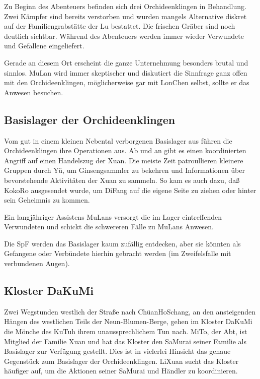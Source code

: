 \documentclass[
a4paper,
twoside,
DIV=calc,
BCOR=4mm,
fontsize=9pt,
twocolumn=on,
titlepage=on,
parskip=half
]{scrartcl}
\begin{document}
Zu Beginn des Abenteuers befinden sich drei Orchideenklingen in
Behandlung. Zwei Kämpfer sind bereits verstorben und wurden mangels
Alternative diskret auf der Familiengrabstätte der Lu bestattet. Die
frischen Gräber sind noch deutlich sichtbar. Während des Abenteuers
werden immer wieder Verwundete und Gefallene eingeliefert.

Gerade an diesem Ort erscheint die ganze Unternehmung besonders brutal
und sinnlos. MuLan wird immer skeptischer und diskutiert die Sinnfrage
ganz offen mit den Orchideenklingen, möglicherweise gar mit LonChen
selbst, sollte er das Anwesen besuchen.

\subsection{Basislager der Orchideenklingen}

Vom gut in einem kleinen Nebental verborgenen Basislager aus führen
die Orchideenklingen ihre Operationen aus. Ab und an gibt es einen
koordinierten Angriff auf einen Handelszug der Xuan. Die meiste Zeit
patroullieren kleinere Gruppen durch Yü, um Ginsengsammler zu bekehren
und Informationen über bevorstehende Aktivitäten der Xuan zu
sammeln. So kam es auch dazu, daß KokoRo ausgesendet wurde, um DiFang
auf die eigene Seite zu ziehen oder hinter sein Geheimnis zu kommen.

Ein langjähriger Assistens MuLans versorgt die im Lager eintreffenden
Verwundeten und schickt die schwereren Fälle zu MuLans Anwesen.

Die SpF werden das Basislager kaum zufällig entdecken, aber sie
könnten als Gefangene oder Verbündete hierhin gebracht werden (im
Zweifelsfalle mit verbundenen Augen).

\subsection{Kloster DaKuMi}

Zwei Wegstunden westlich der Straße nach ChüanHoSchang, an den
ansteigenden Hängen des westlichen Teils der Neun-Blumen-Berge, gehen
im Kloster DaKuMi die Mönche des KuTuh ihrem unaussprechlichem Tun
nach. MiTo, der Abt, ist Mitglied der Familie Xuan und hat das Kloster
den SaMurai seiner Familie als Basislager zur Verfügung gestellt. Dies
ist in vielerlei Hinsicht das genaue Gegenstück zum Basislager der
Orchideenklingen. LiXuan sucht das Kloster häufiger auf, um die
Aktionen seiner SaMurai und Händler zu koordinieren.
\end{document}
